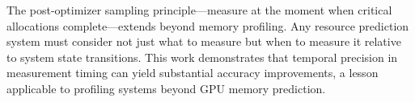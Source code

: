 The post-optimizer sampling principle---measure at the moment when critical allocations complete---extends beyond memory profiling. Any resource prediction system must consider not just what to measure but when to measure it relative to system state transitions. This work demonstrates that temporal precision in measurement timing can yield substantial accuracy improvements, a lesson applicable to profiling systems beyond GPU memory prediction.


